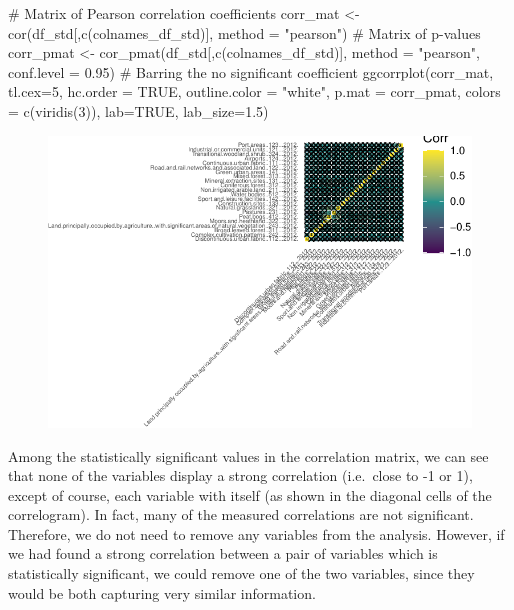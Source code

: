 \documentclass[
  letterpaper,
  DIV=11,
  numbers=noendperiod]{scrreprt}
\newenvironment{Shaded}{\begin{snugshade}}{\end{snugshade}}
\newcommand{\AttributeTok}[1]{\textcolor[rgb]{0.40,0.45,0.13}{#1}}
\newcommand{\CommentTok}[1]{\textcolor[rgb]{0.37,0.37,0.37}{#1}}
\newcommand{\ConstantTok}[1]{\textcolor[rgb]{0.56,0.35,0.01}{#1}}
\newcommand{\DecValTok}[1]{\textcolor[rgb]{0.68,0.00,0.00}{#1}}
\newcommand{\FloatTok}[1]{\textcolor[rgb]{0.68,0.00,0.00}{#1}}
\newcommand{\FunctionTok}[1]{\textcolor[rgb]{0.28,0.35,0.67}{#1}}
\newcommand{\NormalTok}[1]{\textcolor[rgb]{0.00,0.23,0.31}{#1}}
\newcommand{\OtherTok}[1]{\textcolor[rgb]{0.00,0.23,0.31}{#1}}
\newcommand{\StringTok}[1]{\textcolor[rgb]{0.13,0.47,0.30}{#1}}
\begin{document}
\begin{Shaded}
\begin{Highlighting}[]
\CommentTok{\# Matrix of Pearson correlation coefficients}
\NormalTok{corr\_mat }\OtherTok{\textless{}{-}} \FunctionTok{cor}\NormalTok{(df\_std[,}\FunctionTok{c}\NormalTok{(colnames\_df\_std)], }\AttributeTok{method =} \StringTok{"pearson"}\NormalTok{)}
\CommentTok{\# Matrix of p{-}values}
\NormalTok{corr\_pmat }\OtherTok{\textless{}{-}} \FunctionTok{cor\_pmat}\NormalTok{(df\_std[,}\FunctionTok{c}\NormalTok{(colnames\_df\_std)], }\AttributeTok{method =} \StringTok{"pearson"}\NormalTok{, }\AttributeTok{conf.level =} \FloatTok{0.95}\NormalTok{)}
\CommentTok{\# Barring the no significant coefficient}
\FunctionTok{ggcorrplot}\NormalTok{(corr\_mat, }\AttributeTok{tl.cex=}\DecValTok{5}\NormalTok{, }\AttributeTok{hc.order =} \ConstantTok{TRUE}\NormalTok{, }\AttributeTok{outline.color =} \StringTok{"white"}\NormalTok{, }\AttributeTok{p.mat =}\NormalTok{ corr\_pmat, }\AttributeTok{colors =} \FunctionTok{c}\NormalTok{(}\FunctionTok{viridis}\NormalTok{(}\DecValTok{3}\NormalTok{)), }\AttributeTok{lab=}\ConstantTok{TRUE}\NormalTok{, }\AttributeTok{lab\_size=}\FloatTok{1.5}\NormalTok{)}
\end{Highlighting}
\end{Shaded}

\begin{figure}[H]

{\centering \includegraphics{geodemographics_files/figure-pdf/unnamed-chunk-12-1.pdf}

}

\end{figure}

Among the statistically significant values in the correlation matrix, we
can see that none of the variables display a strong correlation
(i.e.~close to -1 or 1), except of course, each variable with itself (as
shown in the diagonal cells of the correlogram). In fact, many of the
measured correlations are not significant. Therefore, we do not need to
remove any variables from the analysis. However, if we had found a
strong correlation between a pair of variables which is statistically
significant, we could remove one of the two variables, since they would
be both capturing very similar information.
\end{document}
